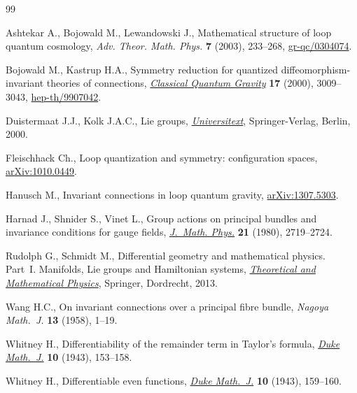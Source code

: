 \documentclass[pdftex]{sigma}
\numberwithin{equation}{section}
\begin{document}
\begin{thebibliography}{99}
\footnotesize\itemsep=0pt

Ashtekar A., Bojowald M., Lewandowski J., Mathematical structure of loop
  quantum cosmology, \textit{Adv. Theor. Math. Phys.} \textbf{7} (2003),
  233--268, \href{http://arxiv.org/abs/gr-qc/0304074}{gr-qc/0304074}.

Bojowald M., Kastrup H.A., Symmetry reduction for quantized
  dif\/feomorphism-invariant theories of connections, \href{http://dx.doi.org/10.1088/0264-9381/17/15/311}{\textit{Classical Quantum
  Gravity}} \textbf{17} (2000), 3009--3043, \href{http://arxiv.org/abs/hep-th/9907042}{hep-th/9907042}.

Duistermaat J.J., Kolk J.A.C., Lie groups, \href{http://dx.doi.org/10.1007/978-3-642-56936-4}{\textit{Universitext}}, Springer-Verlag,
  Berlin, 2000.

Fleischhack Ch., Loop quantization and symmetry: conf\/iguration spaces,
  \href{http://arxiv.org/abs/1010.0449}{arXiv:1010.0449}.

Hanusch M., Invariant connections in loop quantum gravity, \href{http://arxiv.org/abs/1307.5303}{arXiv:1307.5303}.

Harnad J., Shnider S., Vinet L., Group actions on principal bundles and
  invariance conditions for gauge f\/ields, \href{http://dx.doi.org/10.1063/1.524389}{\textit{J.~Math. Phys.}} \textbf{21}
  (1980), 2719--2724.

Rudolph G., Schmidt M., Dif\/ferential geometry and mathematical physics.
  {P}art~{I}. Manifolds, Lie groups and Hamiltonian systems, \href{http://dx.doi.org/10.1007/978-94-007-5345-7}{\textit{Theoretical and
  Mathematical Physics}}, Springer, Dordrecht, 2013.

Wang H.C., On invariant connections over a principal f\/ibre bundle,
  \textit{Nagoya Math.~J.} \textbf{13} (1958), 1--19.

Whitney H., Dif\/ferentiability of the remainder term in {T}aylor's formula,
  \href{http://dx.doi.org/10.1215/S0012-7094-43-01014-2}{\textit{Duke Math.~J.}} \textbf{10} (1943), 153--158.

Whitney H., Dif\/ferentiable even functions, \href{http://dx.doi.org/10.1215/S0012-7094-43-01015-4}{\textit{Duke Math.~J.}} \textbf{10}
  (1943), 159--160.

\end{thebibliography}\LastPageEnding
\end{document}
